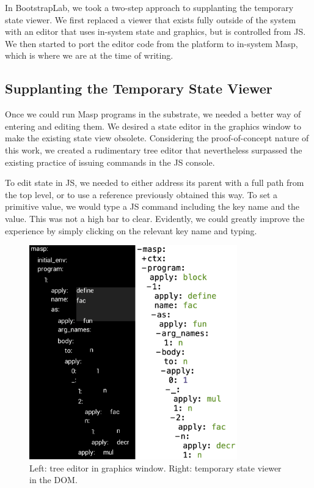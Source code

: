 \documentclass[ twoside,openright,titlepage,numbers=noenddot,headinclude,footinclude,cleardoublepage=empty,abstract=on,
                BCOR=5mm,paper=a4,fontsize=11pt
                ]{scrreprt}
\theoremstyle{definition}
\begin{document}
In BootstrapLab, we took a two-step approach to supplanting the
temporary state viewer. We first replaced a viewer that exists fully
outside of the system with an editor that uses in-system state and
graphics, but is controlled from \ac{JS}. We then started to port the
editor code from the platform to in-system Masp, which is where we are
at the time of writing.

\hypertarget{supplanting-the-temporary-state-viewer}{\subsection{Supplanting the Temporary State
Viewer}\label{supplanting-the-temporary-state-viewer}}

Once we could run Masp programs in the substrate, we needed a better way
of entering and editing them. We desired a state editor in the graphics
window to make the existing state view obsolete. Considering the
proof-of-concept nature of this work, we created a rudimentary tree
editor that nevertheless surpassed the existing practice of issuing
commands in the \ac{JS} console.

To edit state in \ac{JS}, we needed to either address its parent with a
full path from the top level, or to use a reference previously obtained
this way. To set a primitive value, we would type a \ac{JS} command
including the key name and the value. This was not a high bar to clear.
Evidently, we could greatly improve the experience by simply clicking on
the relevant key name and typing.

\begin{figure}
\centering
\includegraphics[width=9cm]{editor.png}
\caption[In-system tree editor vs. HTML state viewer]{Left: tree editor in graphics window. Right: temporary state viewer in the \acs{DOM}.}
\label{fig:editor}
\end{figure}
\end{document}

